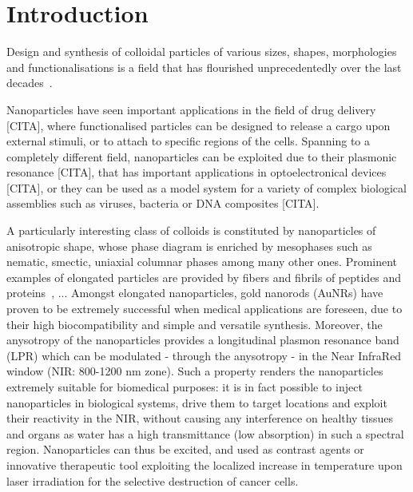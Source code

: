 \documentclass[journal=jacsat,manuscript=article]{achemso}
\begin{document}
\section{Introduction}



Design and synthesis of colloidal particles of various sizes, shapes, morphologies and functionalisations is a field that has flourished unprecedentedly over the last decades~\cite{Hueckel2021,Sacanna2013,Manoharan2015,Glotzer2007}. 

Nanoparticles have seen  important applications in the field of drug delivery [CITA], where functionalised particles can be designed  to release a cargo upon external stimuli, or to attach to specific regions of the cells. Spanning to a completely different field, nanoparticles can be exploited due to their plasmonic resonance [CITA], that has important applications in optoelectronical devices [CITA], or they can be used as a model system  for a variety of complex biological assemblies such as viruses, bacteria or DNA composites [CITA]. 

{\color{green}A particularly interesting class of colloids is constituted by nanoparticles of anisotropic shape, whose
phase diagram is enriched by mesophases such as nematic, smectic, uniaxial columnar phases among many other ones.
Prominent examples of elongated particles are provided by fibers and fibrils of peptides and proteins~\cite{Mezzenga2018,DeMichele2019,DeMichele2021},
... %
}
Amongst elongated nanoparticles, gold nanorods (AuNRs) have proven to be extremely successful when medical applications
are foreseen, due to their high  biocompatibility and simple and versatile synthesis. Moreover, the anysotropy  of the
nanoparticles provides a longitudinal plasmon resonance band (LPR) which can be modulated - through the anysotropy - in %
the Near InfraRed window (NIR: 800-1200 nm zone). Such a property renders the nanoparticles extremely suitable for
biomedical purposes: it is in fact possible to inject nanoparticles in biological systems, drive them to target
locations and exploit their reactivity in the NIR, without causing any interference on healthy tissues and organs as
water has a high transmittance (low absorption) in such a spectral region.
Nanoparticles can thus be excited, and used as contrast agents or innovative therapeutic tool exploiting the localized increase 
in temperature upon laser irradiation for the selective destruction of cancer cells.
\end{document}
